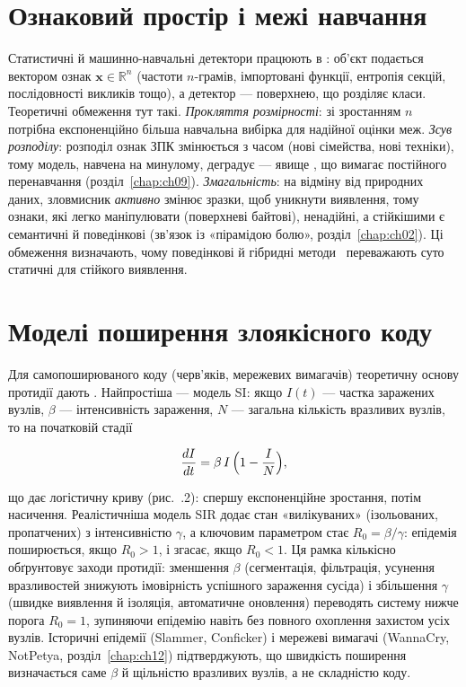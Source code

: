 \section{Ознаковий простір і межі навчання}\label{sec:ch03-features}

Статистичні й машинно-навчальні детектори працюють в : об'єкт подається вектором ознак $\mathbf{x}\in\mathbb{R}^n$ (частоти $n$-грамів, імпортовані функції, ентропія секцій, послідовності викликів тощо), а детектор --- поверхнею, що розділяє класи. Теоретичні обмеження тут такі. \emph{Прокляття розмірності}: зі зростанням $n$ потрібна експоненційно більша навчальна вибірка для надійної оцінки меж. \emph{Зсув розподілу}: розподіл ознак ЗПК змінюється з часом (нові сімейства, нові техніки), тому модель, навчена на минулому, деградує --- явище , що вимагає постійного перенавчання (розділ~\ref{chap:ch09}). \emph{Змагальність}: на відміну від природних даних, зловмисник \emph{активно} змінює зразки, щоб уникнути виявлення, тому ознаки, які легко маніпулювати (поверхневі байтові), ненадійні, а стійкішими є семантичні й поведінкові (зв'язок із «пірамідою болю», розділ~\ref{chap:ch02}). Ці обмеження визначають, чому поведінкові й гібридні методи~\cite{ch03:hybrid,ch03:opirskyi-ml} переважають суто статичні для стійкого виявлення.

\section{Моделі поширення злоякісного коду}\label{sec:ch03-propagation}

Для самопоширюваного коду (черв'яків, мережевих вимагачів) теоретичну основу протидії дають . Найпростіша --- модель SI: якщо $I(t)$ --- частка заражених вузлів, $\beta$ --- інтенсивність зараження, $N$ --- загальна кількість вразливих вузлів, то на початковій стадії

\begin{equation}
\frac{dI}{dt} = \beta\, I\,\Bigl(1 - \frac{I}{N}\Bigr),
\label{eq:ch03-si}
\end{equation}

що дає логістичну криву (рис.~\thechapter.2): спершу експоненційне зростання, потім насичення. Реалістичніша модель SIR додає стан «вилікуваних» (ізольованих, пропатчених) з інтенсивністю $\gamma$, а ключовим параметром стає  $R_0 = \beta/\gamma$: епідемія поширюється, якщо $R_0 > 1$, і згасає, якщо $R_0 < 1$. Ця рамка кількісно обґрунтовує заходи протидії: зменшення $\beta$ (сегментація, фільтрація, усунення вразливостей знижують імовірність успішного зараження сусіда) і збільшення $\gamma$ (швидке виявлення й ізоляція, автоматичне оновлення) переводять систему нижче порога $R_0 = 1$, зупиняючи епідемію навіть без повного охоплення захистом усіх вузлів. Історичні епідемії (Slammer, Conficker) і мережеві вимагачі (WannaCry, NotPetya, розділ~\ref{chap:ch12}) підтверджують, що швидкість поширення визначається саме $\beta$ й щільністю вразливих вузлів, а не складністю коду.

